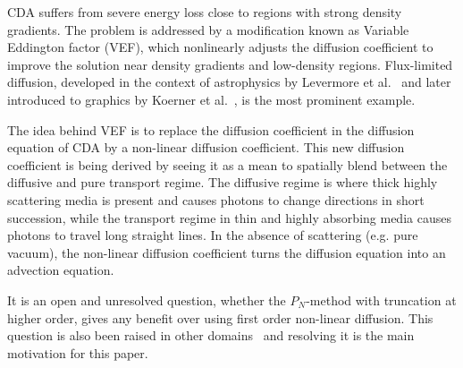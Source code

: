CDA suffers from severe energy loss close to regions with strong density gradients. The problem is addressed by a modification known as Variable Eddington factor (VEF), which nonlinearly adjusts the diffusion coefficient to improve the solution near density gradients and low-density regions. Flux-limited diffusion, developed in the context of astrophysics by Levermore et al.~\cite{Levermore81} and later introduced to graphics by Koerner et al.~\cite{Koerner14}, is the most prominent example.

The idea behind VEF is to replace the diffusion coefficient in the diffusion equation of CDA by a non-linear diffusion coefficient. This new diffusion coefficient is being derived by seeing it as a mean to spatially blend between the diffusive and pure transport regime. The diffusive regime is where thick highly scattering media is present and causes photons to change directions in short succession, while the transport regime in thin and highly absorbing media causes photons to travel long straight lines. In the absence of scattering (e.g. pure vacuum), the non-linear diffusion coefficient turns the diffusion equation into an advection equation.

It is an open and unresolved question, whether the $P_N$-method with truncation at higher order, gives any benefit over using first order non-linear diffusion. This question is also been raised in other domains~\cite{Olson00} and resolving it is the main motivation for this paper.
 



